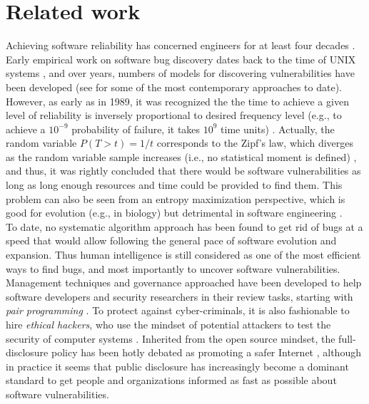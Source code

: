 \section{Related work}
\label{sec:related}
Achieving software reliability has concerned engineers for at least four decades \cite{littlewood1973bayesian,adams1984textordfeminineoptimizing,littlewood1989predicting}. Early empirical work on software bug discovery dates back to the time of UNIX systems \cite{miller1990empirical}, and over years, numbers of models for discovering vulnerabilities have been developed (see \cite{yamaguchi2014modeling,zhao2016empirical} for some of the most contemporary approaches to date). However, as early as in 1989, it was recognized the the time to achieve a given level of reliability is inversely proportional to desired frequency level (e.g., to achieve a $10^{-9}$ probability of failure, it takes $10^{9}$ time units) \cite{adams1984textordfeminineoptimizing}. Actually, the random variable $P(T > t) = 1/t$ corresponds to the Zipf's law, which diverges as the random variable sample increases (i.e., no statistical moment is defined) \cite{maillart2008empirical,saichev2009theory}, and thus, it was rightly concluded that there would be software vulnerabilities as long as long enough resources and time could be provided to find them. This problem can also be seen from an entropy maximization perspective, which is good for evolution (e.g., in biology) but detrimental in software engineering \cite{brady1999murphy}. \\

To date, no systematic algorithm approach has been found to get rid of bugs at a speed that would allow following the general pace of software evolution and expansion. Thus human intelligence is still considered as one of the most efficient ways to find bugs, and most importantly to uncover software vulnerabilities. Management techniques and governance approached have been developed to help software developers and security researchers in their review tasks, starting with {\it pair programming} \cite{hulkko2005multiple}. To protect against cyber-criminals, it is also fashionable to hire {\it ethical hackers}, who use the mindset of potential attackers to test the security of computer systems \cite{smith2002ethical,saleem2006ethical,bishop2007penetration}. Inherited from the open source mindset, the full-disclosure policy has been hotly debated as promoting a safer Internet \cite{arora2008optimal}, although in practice it seems that public disclosure has increasingly become a dominant standard to get people and organizations informed as fast as possible about software vulnerabilities.\\

